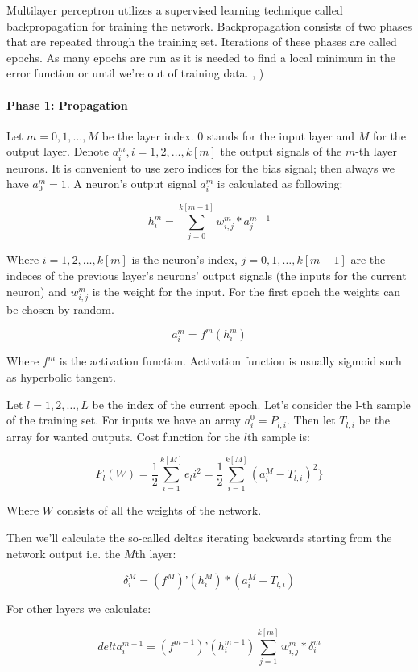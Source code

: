 Multilayer perceptron utilizes a supervised learning technique called backpropagation for training the network. Backpropagation consists of two phases that are repeated through the training set. Iterations of these phases are called epochs. As many epochs are run as it is needed to find a local minimum in the error function or until we’re out of training data.  \cite{wiki:mlp} \cite{wiki:backprop} , )

\paragraph{Phase 1: Propagation}

Let $m = 0, 1, …, M$ be the layer index. 0 stands for the input layer and $M$ for the output layer. Denote $a_i^m, i = 1, 2, …, k[m]$ the output signals of the $m$-th layer neurons. It is convenient to use zero indices for the bias signal; then always we have $a_0^m = 1$. A neuron’s output signal $a_i^m$ is calculated as following:

\[ h_i^m = \sum_{j=0}^{k[m-1]} w_{i,j}^m * a_j^{m-1} \]

Where $i = 1, 2, …, k[m]$ is the neuron’s index, $j = 0, 1, …, k[m-1]$ are the indeces of the previous layer’s neurons’ output signals (the inputs for the current neuron) and $w_{i,j}^m$ is the weight for the input. For the first epoch the weights can be chosen by random.

\[ a_i^m = f^m(h_i^m) \]

Where $f^m$ is the activation function. Activation function is usually sigmoid such as hyperbolic tangent.

Let $l = 1, 2, …, L$ be the index of the current epoch. Let’s consider the l-th sample of the training set. For inputs we have an array $a_i^0 = P_{l,i}$. Then let $T_{l,i}$ be the array for wanted outputs. Cost function for the $l$th sample is:

\[ F_l(W) = \frac{1}{2} \sum_{i=1}^{k[M]} e_li^2 = \frac{1}{2} \sum_{i=1}^{k[M]} (a_i^M - T_{l,i})^2 \} \]

Where $W$ consists of all the weights of the network.

Then we’ll calculate the so-called deltas iterating backwards starting from the network output i.e. the $M$th layer:

\[ \delta_i^M = (f^M)’(h_i^M)*(a_i^M - T_{l,i}) \]

For other layers we calculate:

\[ delta_i^{m-1} = (f^{m-1})’(h_i^{m-1}) \sum_{j=1}^{k[m]} w_{i,j}^m*\delta_i^m \]

